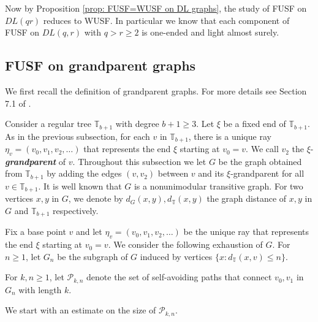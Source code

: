 \documentclass[12pt]{article}
\numberwithin{equation}{section}
\newcommand{\1}{\mathbf{1}}
\newcommand{\notion}[1]{{\bf  \textit{#1}}}
\begin{document}
 
Now by Proposition \ref{prop: FUSF=WUSF on DL graphs}, the study of FUSF on $DL(qr)$ reduces to WUSF. In particular we know that  each component of FUSF on $DL(q,r)$ with $q>r\geq2$ is one-ended and light almost surely.
 
 
 
 
 
 
 
 
 
 
 
 
 
 
 
 
 
 
 
 \subsection{FUSF on grandparent graphs}
 
 We first recall the definition of grandparent graphs. For more details see Section 7.1 of \cite{LP2016}. 
 
 Consider a regular tree $\mathbb{T}_{b+1}$ with degree $b+1\geq3$. Let $\xi$ be a fixed end of $\mathbb{T}_{b+1}$. As in the previous subsection, for each $v$ in $\mathbb{T}_{b+1}$, there is a unique ray $\eta_v=(v_0,v_1,v_2,\ldots)$ that represents the end $\xi$ starting at $v_0=v$.  
 We call $v_2$ the $\xi$-\notion{grandparent} of $v$. Throughout this subsection we let $G$ be the graph obtained from $\mathbb{T}_{b+1}$ by adding the edges $(v,v_2)$ between $v$ and its $\xi$-grandparent for all $v\in\mathbb{T}_{b+1}$. It is well known that $G$ is a nonunimodular transitive graph. For two vertices $x,y$ in $G$, we denote by $d_G(x,y),d_{\mathbb{T}}(x,y)$ the graph distance of $x,y$ in $G$ and $\mathbb{T}_{b+1}$ respectively. 
 
Fix a base point $v$ and let  $\eta_v=(v_0,v_1,v_2,\ldots)$ be the unique ray that represents the end $\xi$ starting at $v_0=v$.  We consider the following exhaustion of $G$.  For $n\geq 1$, let $G_n$ be the subgraph of $G$ induced by vertices $\{x:d_{\mathbb{T}}(x,v)\leq n \}$.
 
 For $k,n\geq 1$, let $\mathscr{P}_{k,n}$ denote the set of self-avoiding paths that connect $v_0,v_1$ in $G_n$ with length $k$.
 
 We start with an estimate on the size of $\mathscr{P}_{k,n}$. 
 
\end{document}
